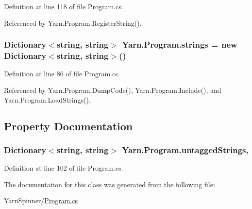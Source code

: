 Definition at line 118 of file Program.\-cs.



Referenced by Yarn.\-Program.\-Register\-String().

\hypertarget{a00142_a59263e00cecfe36d9881b4c30b048f09}{
\subsubsection[{strings}]{\setlength{\rightskip}{0pt plus 5cm}Dictionary$<$string, string$>$ Yarn.\-Program.\-strings = new Dictionary$<$string, string$>$()\hspace{0.3cm}{\ttfamily [package]}}}\label{a00142_a59263e00cecfe36d9881b4c30b048f09}


Definition at line 86 of file Program.\-cs.



Referenced by Yarn.\-Program.\-Dump\-Code(), Yarn.\-Program.\-Include(), and Yarn.\-Program.\-Load\-Strings().



\subsection{Property Documentation}
\hypertarget{a00142_aa8fedbfceaf931d1da3f600eaab6ae87}{
\subsubsection[{untagged\-Strings}]{\setlength{\rightskip}{0pt plus 5cm}Dictionary$<$string, string$>$ Yarn.\-Program.\-untagged\-Strings\hspace{0.3cm}{\ttfamily [get]}, {\ttfamily [package]}}}\label{a00142_aa8fedbfceaf931d1da3f600eaab6ae87}


Definition at line 102 of file Program.\-cs.



The documentation for this class was generated from the following file\-:\begin{DoxyCompactItemize}
\item 
Yarn\-Spinner/\hyperlink{a00296}{Program.\-cs}\end{DoxyCompactItemize}
